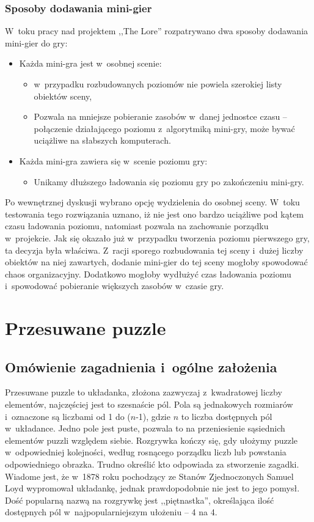 \documentclass[oneside,polski,logo]{amuthesis}
\begin{document}
\subsubsection{Sposoby dodawania mini-gier}
\par W~toku pracy nad projektem ,,The Lore'' rozpatrywano dwa sposoby dodawania mini-gier do gry:
\begin{itemize}
\item{Każda mini-gra jest w~osobnej scenie:}
\begin{itemize}
\item w~przypadku rozbudowanych poziomów nie powiela szerokiej listy obiektów sceny,
\item Pozwala na mniejsze pobieranie zasobów w~danej jednostce czasu – połączenie działającego poziomu z~algorytmiką mini-gry, może bywać uciążliwe na słabszych komputerach.
\end{itemize}
\item{Każda mini-gra zawiera się w~scenie poziomu gry:}
\begin{itemize}
\item Unikamy dłuższego ładowania się poziomu gry po zakończeniu mini-gry.
\end{itemize}
\end{itemize}
Po wewnętrznej dyskusji wybrano opcję wydzielenia do osobnej sceny. W~toku testowania tego rozwiązania uznano, iż nie jest ono bardzo uciążliwe pod kątem czasu ładowania poziomu, natomiast pozwala na zachowanie porządku w~projekcie. Jak się okazało już w~przypadku tworzenia poziomu pierwszego gry, ta decyzja była właściwa. Z~racji sporego rozbudowania tej sceny i~dużej liczby obiektów na niej zawartych, dodanie mini-gier do tej sceny mogłoby spowodować chaos organizacyjny. Dodatkowo mogłoby wydłużyć czas ładowania poziomu i~spowodować pobieranie większych zasobów w~czasie gry.


\section{Przesuwane puzzle}
\subsection{Omówienie zagadnienia i~ogólne założenia}
\par Przesuwane puzzle to układanka, złożona zazwyczaj z~kwadratowej liczby elementów, najczęściej jest to szesnaście pól. Pola są jednakowych rozmiarów i~oznaczone są liczbami od 1 do (\(n\)-1), gdzie \(n\) to liczba dostępnych pól w~układance. Jedno pole jest puste, pozwala to na przeniesienie sąsiednich elementów puzzli względem siebie. Rozgrywka kończy się, gdy ułożymy puzzle w~odpowiedniej kolejności, według rosnącego porządku liczb lub powstania odpowiedniego obrazka. Trudno określić kto odpowiada za stworzenie zagadki. Wiadome jest, że w~1878 roku pochodzący ze Stanów Zjednoczonych Samuel Loyd wypromował układankę, jednak prawdopodobnie nie jest to jego pomysł. Dość popularną nazwą na rozgrywkę jest ,,piętnastka'', określająca ilość dostępnych pól w~najpopularniejszym ułożeniu – 4 na 4.  \cite{przesuwane_puzzle}
\end{document}
